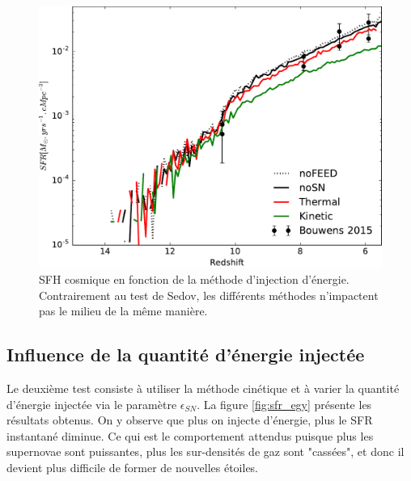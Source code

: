 
\begin{figure}
        \includegraphics[width=.95\textwidth]{img/03/sedov/SFRmethode.pdf} 
        \caption[SFH cosmique en fonction de la méthode d'injection d'énergie]{SFH cosmique en fonction de la méthode d'injection d'énergie.
        Contrairement au test de Sedov, les différents méthodes n'impactent pas le milieu de la même manière.
        }
 		\label{fig:sfr_methode}
\end{figure}



\subsection{Influence de la quantité d'énergie injectée}
\label{sec:snegy}

Le deuxième test consiste à utiliser la méthode cinétique et à varier la quantité d'énergie injectée via le paramètre $\epsilon_{SN}$.
La figure \ref{fig:sfr_egy} présente les résultats obtenus.
On y observe que plus on injecte d'énergie, plus le \ac{SFR} instantané diminue.
Ce qui est le comportement attendus puisque plus les supernovae sont puissantes, plus les sur-densités de gaz sont "cassées", et donc il devient plus difficile de former de nouvelles étoiles.

